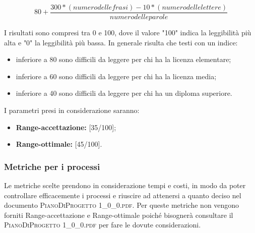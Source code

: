 		\[ 80+\frac{300*(numero delle frasi)-10*(numero delle lettere)}{numero delle parole} \]
		
		
		I risultati sono compresi tra 0 e 100, dove il valore "100" indica la leggibilità più alta e "0" la leggibilità più bassa. In generale risulta che testi con un indice:
		\begin{itemize}
			\item inferiore a 80 sono difficili da leggere per chi ha la licenza elementare;
			\item inferiore a 60 sono difficili da leggere per chi ha la licenza media;
			\item inferiore a 40 sono difficili da leggere per chi ha un diploma superiore.
		\end{itemize}
	
		I parametri presi in considerazione saranno:
	
		\begin{itemize}
			\item \textbf{Range-accettazione: }[35/100];
			\item \textbf{Range-ottimale: }[45/100].
		\end{itemize}
	
		\subsubsection{Metriche per i processi}
		Le metriche scelte prendono in considerazione tempi e costi, in modo da poter controllare efficacemente i processi e riuscire ad attenersi a quanto deciso nel documento \textsc{PianoDiProgetto 1\_0\_0.pdf}. 
		Per queste metriche non vengono forniti Range-accettazione e Range-ottimale poiché bisognerà consultare il \textsc{PianoDiProgetto 1\_0\_0.pdf} per fare le dovute considerazioni.
		
